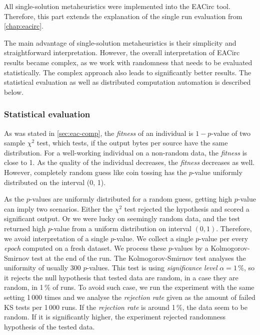 \documentclass[
    digital,    %
    oneside,    %
    color,
    11pt,
    nocover,
    notable,
    nolof,
    nolot,
]{fithesis3}
\begin{document}
All single-solution metaheuristics were implemented into the EACirc tool. Therefore, this part extends the explanation of the single run evaluation from \cref{chap:eacirc}.

The main advantage of single-solution metaheuristics is their simplicity and straightforward interpretation. However, the overall interpretation of EACirc results became complex, as we work with randomness that needs to be evaluated statistically. The complex approach also leads to significantly better results. The statistical evaluation as well as distributed computation automation is described below.


\subsubsection{\textbf{Statistical evaluation}}
\label{subsubsec:method-spec-ss-stat}

As was stated in \cref{sec:eac-comp}, the \textit{fitness} of an individual is $1 - p$-value of two sample $\chi^{2}$ test, which tests, if the output bytes per source have the same distribution. For a well-working individual on a non-random data, the \textit{fitness} is close to 1. As the quality of the individual decreases, the \textit{fitness} decreases as well. However, completely random guess like coin tossing has the $p$-value uniformly distributed on the interval (0, 1).

As the $p$-values are uniformly distributed for a random guess, getting high $p$-value can imply two scenarios. Either the $\chi^{2}$ test rejected the hypothesis and scored a significant output. Or we were lucky on seemingly random data, and the test returned high $p$-value from a uniform distribution on interval $(0, 1)$. Therefore, we avoid interpretation of a single $p$-value. We collect a single $p$-value per every \textit{epoch} computed on a fresh dataset. We process these $p$-values by a Kolmogorov-Smirnov test at the end of the run. The Kolmogorov-Smirnov test analyses the uniformity of usually 300 $p$-values. This test is using \textit{significance level} $\alpha = 1\,\%$, so it rejects the null hypothesis that tested data are random, in a case they are random, in 1\,\% of runs. To avoid such case, we run the experiment with the same setting 1\,000 times and we analyse the \textit{rejection rate} given as the amount of failed KS tests per 1\,000 runs. If the \textit{rejection rate} is around 1\,\%, the data seem to be random. If it is significantly higher, the experiment rejected randomness hypothesis of the tested data.
\end{document}
